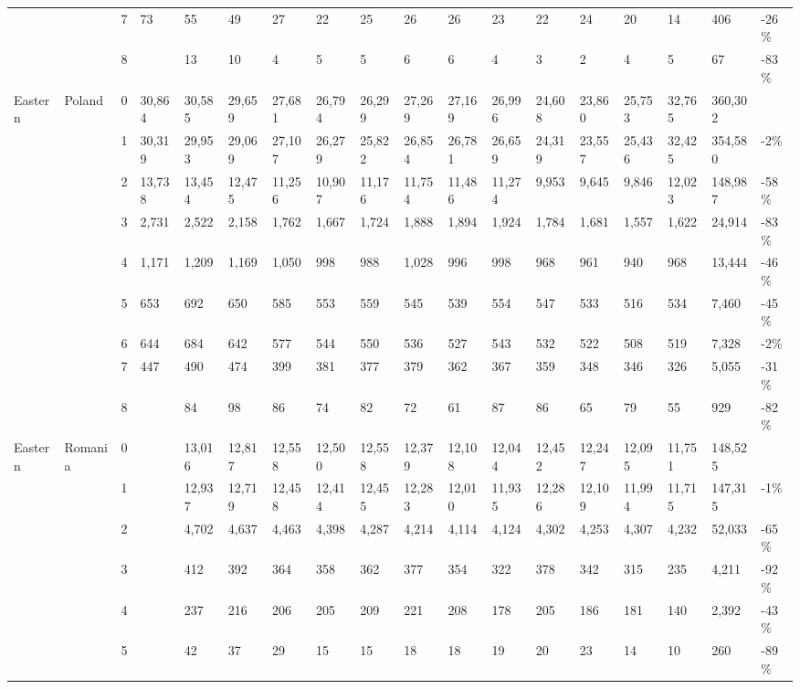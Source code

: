 \begin{longtable}{llllllllllllllllll}
   &  & 7 & 73 & 55 & 49 & 27 & 22 & 25 & 26 & 26 & 23 & 22 & 24 & 20 & 14 & 406 & -26\% \\ 
   &  & 8 &  & 13 & 10 & 4 & 5 & 5 & 6 & 6 & 4 & 3 & 2 & 4 & 5 & 67 & -83\% \\ 
  Eastern & Poland & 0 & 30,864 & 30,585 & 29,659 & 27,681 & 26,794 & 26,299 & 27,269 & 27,169 & 26,996 & 24,608 & 23,860 & 25,753 & 32,765 & 360,302 &  \\ 
   &  & 1 & 30,319 & 29,953 & 29,069 & 27,107 & 26,279 & 25,822 & 26,854 & 26,781 & 26,659 & 24,319 & 23,557 & 25,436 & 32,425 & 354,580 & -2\% \\ 
   &  & 2 & 13,738 & 13,454 & 12,475 & 11,256 & 10,907 & 11,176 & 11,754 & 11,486 & 11,274 & 9,953 & 9,645 & 9,846 & 12,023 & 148,987 & -58\% \\ 
   &  & 3 & 2,731 & 2,522 & 2,158 & 1,762 & 1,667 & 1,724 & 1,888 & 1,894 & 1,924 & 1,784 & 1,681 & 1,557 & 1,622 & 24,914 & -83\% \\ 
   &  & 4 & 1,171 & 1,209 & 1,169 & 1,050 & 998 & 988 & 1,028 & 996 & 998 & 968 & 961 & 940 & 968 & 13,444 & -46\% \\ 
   &  & 5 & 653 & 692 & 650 & 585 & 553 & 559 & 545 & 539 & 554 & 547 & 533 & 516 & 534 & 7,460 & -45\% \\ 
   &  & 6 & 644 & 684 & 642 & 577 & 544 & 550 & 536 & 527 & 543 & 532 & 522 & 508 & 519 & 7,328 & -2\% \\ 
   &  & 7 & 447 & 490 & 474 & 399 & 381 & 377 & 379 & 362 & 367 & 359 & 348 & 346 & 326 & 5,055 & -31\% \\ 
   &  & 8 &  & 84 & 98 & 86 & 74 & 82 & 72 & 61 & 87 & 86 & 65 & 79 & 55 & 929 & -82\% \\ 
  Eastern & Romania & 0 &  & 13,016 & 12,817 & 12,558 & 12,500 & 12,558 & 12,379 & 12,108 & 12,044 & 12,452 & 12,247 & 12,095 & 11,751 & 148,525 &  \\ 
   &  & 1 &  & 12,937 & 12,719 & 12,458 & 12,414 & 12,455 & 12,283 & 12,010 & 11,935 & 12,286 & 12,109 & 11,994 & 11,715 & 147,315 & -1\% \\ 
   &  & 2 &  & 4,702 & 4,637 & 4,463 & 4,398 & 4,287 & 4,214 & 4,114 & 4,124 & 4,302 & 4,253 & 4,307 & 4,232 & 52,033 & -65\% \\ 
   &  & 3 &  & 412 & 392 & 364 & 358 & 362 & 377 & 354 & 322 & 378 & 342 & 315 & 235 & 4,211 & -92\% \\ 
   &  & 4 &  & 237 & 216 & 206 & 205 & 209 & 221 & 208 & 178 & 205 & 186 & 181 & 140 & 2,392 & -43\% \\ 
   &  & 5 &  & 42 & 37 & 29 & 15 & 15 & 18 & 18 & 19 & 20 & 23 & 14 & 10 & 260 & -89\% \\ 

\end{longtable}
